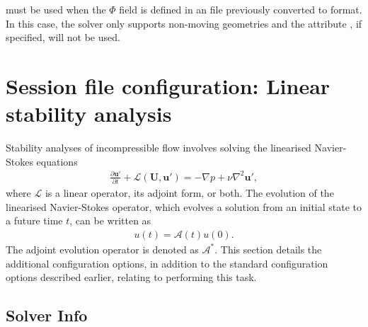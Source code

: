 must be used when the $\Phi$ field is defined in an  file
previously converted to  format. In this case, the solver only
supports non-moving geometries and the attribute
, if specified, will not be used.


\section{Session file configuration: Linear stability analysis}
\label{SecStabFile}
Stability analyses of incompressible flow involves solving the linearised Navier-Stokes equations
\begin{align*}
    \frac{\partial\mathbf{u'}}{\partial t} +\mathcal{L}(\mathbf{U},\mathbf{u'})=-\nabla p+\nu \nabla^2 \mathbf{u'},
\end{align*}
where $\mathcal{L}$ is a linear operator, its adjoint form, or both. The evolution of the linearised Navier-Stokes operator, which evolves a solution from an initial state to a future time $t$, can be written as
\begin{align*}
u(t) = \mathcal{A}(t)u(0).
\end{align*}
The adjoint evolution operator is denoted as $\mathcal{A}^*$.
This section details the additional configuration options, in addition to the standard configuration options described earlier, relating to performing this task.

\subsection{Solver Info}
\label{SectionIncNS_SolverInfo_Stab}

